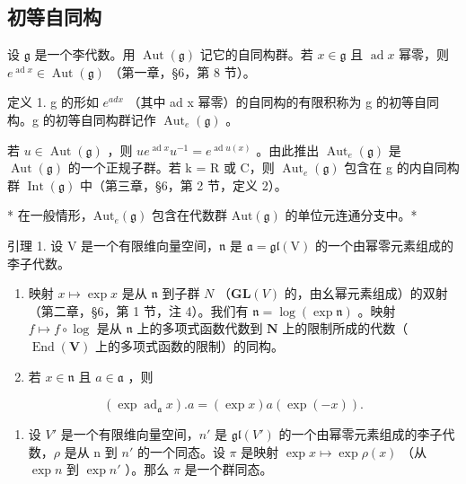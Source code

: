 \subsection{初等自同构}

设 \(\mathfrak{g}\) 是一个李代数。用 \(\operatorname{Aut}(\mathfrak{g})\) 记它的自同构群。若 \(x \in \mathfrak{g}\) 且 \(\operatorname{ad} x\) 幂零，则 \(e^{\operatorname{ad} x} \in \operatorname{Aut}(\mathfrak{g})\) （第一章，§6，第 8 节）。

定义 1. g 的形如 \(e^{ad x}\) （其中 ad x 幂零）的自同构的有限积称为 g 的初等自同构。g 的初等自同构群记作 \(\operatorname{Aut}_{e}(\mathfrak{g})\) 。

若 \(u \in \operatorname{Aut}(\mathfrak{g})\) ，则 \(ue^{\operatorname{ad}x}u^{-1} = e^{\operatorname{ad}u(x)}\) 。由此推出 \(\operatorname{Aut}_{e}(\mathfrak{g})\) 是 \(\operatorname{Aut}(\mathfrak{g})\) 的一个正规子群。若 k = R 或 C，则 \(\operatorname{Aut}_{e}(\mathfrak{g})\) 包含在 g 的内自同构群 \(\operatorname{Int}(\mathfrak{g})\) 中（第三章，§6，第 2 节，定义 2）。

* 在一般情形，\(\mathrm{Aut}_e(\mathfrak{g})\) 包含在代数群 \(\mathrm{Aut}(\mathfrak{g})\) 的单位元连通分支中。*

引理 1. 设 \(\mathrm{V}\) 是一个有限维向量空间，\(\mathfrak{n}\) 是 \(\mathfrak{a} = \mathfrak{gl}(\mathrm{V})\) 的一个由幂零元素组成的李子代数。

\begin{enumerate}
\def\labelenumi{(\roman{enumi})}
\item
  映射 \(x \mapsto \exp x\) 是从 \(\mathfrak{n}\) 到子群 \(N\) （\(\mathbf{GL}(V)\) 的，由幺幂元素组成）的双射（第二章，§6，第 1 节，注 4）。我们有 \(\mathfrak{n} = \log(\exp \mathfrak{n})\) 。映射 \(f \mapsto f \circ \log\) 是从 \(\mathfrak{n}\) 上的多项式函数代数到 \(\mathbf{N}\) 上的限制所成的代数（\(\operatorname{End}(\mathbf{V})\) 上的多项式函数的限制）的同构。
\item
  若 \(x \in \mathfrak{n}\) 且 \(a \in \mathfrak{a}\) ，则
\end{enumerate}

\[
(\exp \operatorname{ad} _ {\mathfrak {a}} x). a = (\exp x) a (\exp (- x)).
\]

\begin{enumerate}
\def\labelenumi{(\roman{enumi})}
\setcounter{enumi}{2}
\tightlist
\item
  设 \(V'\) 是一个有限维向量空间，\(n'\) 是 \(\mathfrak{gl}(V')\) 的一个由幂零元素组成的李子代数，\(\rho\) 是从 n 到 \(n'\) 的一个同态。设 \(\pi\) 是映射 \(\exp x \mapsto \exp \rho(x)\) （从 \(\exp n\) 到 \(\exp n'\) ）。那么 \(\pi\) 是一个群同态。
\end{enumerate}

